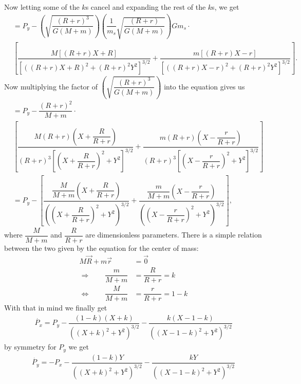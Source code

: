 Now letting some of the $k$s cancel and expanding the rest of the $k$s, we get
\begin{align}
\nonumber &= P_y - \left(\sqrt{\dfrac{(R+r)^3}{G(M+m)}}\right) \left(\dfrac{1}{m_s} \sqrt{\dfrac{(R+r)}{G(M+m)}}\right) G m_s \cdot \\
&\left[\dfrac{M[(R+r) X + R]}{[((R+r) X + R)^2 + (R+r)^2 Y^2]^{3/2}} + \dfrac{m[(R+r) X - r]}{[((R+r) X - r)^2 + (R+r)^2 Y^2]^{3/2}} \right].
\end{align}
Now multiplying the factor of $\left(\sqrt{\dfrac{(R+r)^3}{G(M+m)}}\right)$ into the equation gives us
\begin{align}
\nonumber &= P_y - \dfrac{(R+r)^2}{M+m} \cdot \\ 
&\left[\dfrac{M(R+r)\left(X + \dfrac{R}{R+r}\right)}{(R+r)^3\left[\left(X + \dfrac{R}{R+r}\right)^2 + Y^2\right]^{3/2}} + \dfrac{m (R+r)\left(X - \dfrac{r}{R+r}\right)}{(R+r)^3\left[\left(X - \dfrac{r}{R+r}\right)^2 + Y^2\right]^{3/2}} \right] \\[1cm]
&= P_y - \left[\dfrac{\dfrac{M}{M+m}\left(X + \dfrac{R}{R+r}\right)}{\left(\left(X + \dfrac{R}{R+r}\right)^2 + Y^2\right)^{3/2}} + \dfrac{\dfrac{m}{M+m} \left(X - \dfrac{r}{R+r}\right)}{\left(\left(X - \dfrac{r}{R+r}\right)^2 + Y^2\right)^{3/2}} \right] ,
\end{align}
where $\dfrac{M}{M+m}$ and $\dfrac{R}{R+r}$ are dimensionless parameters. There is a simple relation between the two given by the equation for the center of mass:
\begin{align}
M\vec{R} + m\vec{r} &= \vec{0} \\[0.5cm]
\Rightarrow \qquad \dfrac{m}{M+m} &= \dfrac{R}{R+r} = k \\[0.5cm]
\Leftrightarrow \qquad \dfrac{M}{M+m} &= \dfrac{r}{R+r} = 1-k  
\end{align}
With that in mind we finally get
\begin{align}
\dot{P_x} = P_y - \dfrac{(1-k)(X+k)}{((X+k)^2+Y^2)^{3/2}} - \dfrac{k(X-1-k)}{((X-1-k)^2+Y^2)^{3/2}}
\end{align}
by symmetry for $P_y$ we get
\begin{align}
\dot{P_y} = -P_x - \dfrac{(1-k)Y}{((X+k)^2+Y^2)^{3/2}} - \dfrac{k Y}{((X-1-k)^2+Y^2)^{3/2}}
\end{align}
